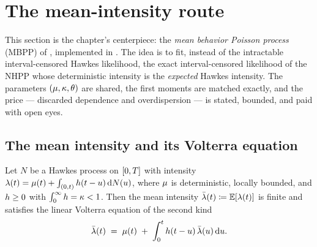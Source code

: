 \section{The mean-intensity route}\label{ch06:sec:mbpp}

This section is the chapter's centerpiece: the \emph{mean behavior Poisson
process} (MBPP) of \citet{rizoiu2022}, implemented in
. The idea is to fit, instead of the intractable
interval-censored Hawkes likelihood, the exact interval-censored likelihood
of the NHPP whose deterministic intensity is the \emph{expected} Hawkes
intensity. The parameters $(\mu,\kappa,\theta)$ are shared, the first
moments are matched exactly, and the price --- discarded dependence and
overdispersion --- is stated, bounded, and paid with open eyes.

\subsection{The mean intensity and its Volterra equation}\label{ch06:sec:volterra}

\begin{theorem}\label{thm:ch06:volterra}
Let $N$ be a Hawkes process on $[0,T]$ with intensity
$\lambda(t) = \mu(t) + \int_{(0,t)}h(t-u)\,\mathrm{d} N(u)$, where $\mu$ is
deterministic, locally bounded, and $h \ge 0$ with
$\int_0^\infty h = \kappa < 1$. Then the mean intensity
$\bar{\lambda}(t) \coloneqq \mathbb{E}[\lambda(t)]$ is finite and satisfies the linear Volterra
equation of the second kind
\begin{equation}\label{eq:ch06:volterra}
\bar{\lambda}(t) \;=\; \mu(t) \;+\; \int_0^{t} h(t-u)\,\bar{\lambda}(u)\,\mathrm{d} u .
\end{equation}
\end{theorem}

